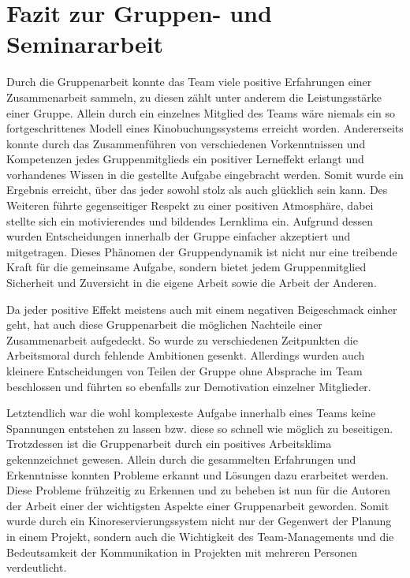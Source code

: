\section{Fazit zur Gruppen- und Seminararbeit}
\multipleauthorsection{\authorRF}{\authorEJ}

Durch die Gruppenarbeit konnte das Team viele positive Erfahrungen einer Zusammenarbeit sammeln, zu diesen zählt unter anderem die Leistungsstärke einer Gruppe.
Allein durch ein einzelnes Mitglied des Teams wäre niemals ein so fortgeschrittenes Modell eines Kinobuchungssystems erreicht worden.
Andererseits konnte durch das Zusammenführen von verschiedenen Vorkenntnissen und Kompetenzen jedes Gruppenmitglieds ein positiver Lerneffekt erlangt und vorhandenes Wissen in die gestellte Aufgabe eingebracht werden.
Somit wurde ein Ergebnis erreicht, über das jeder sowohl stolz als auch glücklich sein kann.
Des Weiteren führte gegenseitiger Respekt zu einer positiven Atmosphäre, dabei stellte sich ein motivierendes und bildendes Lernklima ein.
Aufgrund dessen wurden Entscheidungen innerhalb der Gruppe einfacher akzeptiert und mitgetragen.
Dieses Phänomen der Gruppendynamik ist nicht nur eine treibende Kraft für die gemeinsame Aufgabe, sondern bietet jedem Gruppenmitglied Sicherheit und Zuversicht in die eigene Arbeit sowie die Arbeit der Anderen.

Da jeder positive Effekt meistens auch mit einem negativen Beigeschmack einher geht, hat auch diese Gruppenarbeit die möglichen Nachteile einer Zusammenarbeit aufgedeckt.
So wurde zu verschiedenen Zeitpunkten die Arbeitsmoral durch fehlende Ambitionen gesenkt.
Allerdings wurden auch kleinere Entscheidungen von Teilen der Gruppe ohne Absprache im Team beschlossen und führten so ebenfalls zur Demotivation einzelner Mitglieder.


Letztendlich war die wohl komplexeste Aufgabe innerhalb eines Teams keine Spannungen entstehen zu lassen bzw. diese so schnell wie möglich zu beseitigen.
Trotzdessen ist die Gruppenarbeit durch ein positives Arbeitsklima gekennzeichnet gewesen.
Allein durch die gesammelten Erfahrungen und Erkenntnisse konnten Probleme erkannt und Lösungen dazu erarbeitet werden.
Diese Probleme frühzeitig zu Erkennen und zu beheben ist nun für die Autoren der Arbeit einer der wichtigsten Aspekte einer Gruppenarbeit geworden.
Somit wurde durch ein Kinoreservierungssystem nicht nur der Gegenwert der Planung in einem Projekt, sondern auch die Wichtigkeit des Team-Managements und die Bedeutsamkeit der Kommunikation in Projekten mit mehreren Personen verdeutlicht.
